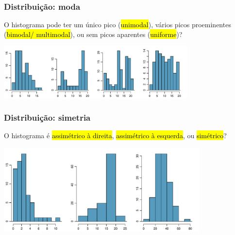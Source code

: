 \begin{frame}
\frametitle{Distribuição: moda}
\justifying
O histograma pode ter um único pico (\hl{unimodal}), vários picos proeminentes (\hl{bimodal/ multimodal}), ou sem picos aparentes (\hl{uniforme})?

\begin{center}
\includegraphics[width=0.75\textwidth]{1-6_numerical_data/singleBiMultiModalUnifPlots.pdf}
\end{center}
\justifying
{}

\end{frame}


\begin{frame}
\frametitle{Distribuição: simetria}
\justifying
O histograma é \hl{assimétrico à direita}, \hl{assimétrico à esquerda}, ou \hl{simétrico}?

\begin{center}
\includegraphics[width=0.8\textwidth]{1-6_numerical_data/skewedSymPlots.pdf}
\end{center}
\justifying
{}

\end{frame}


